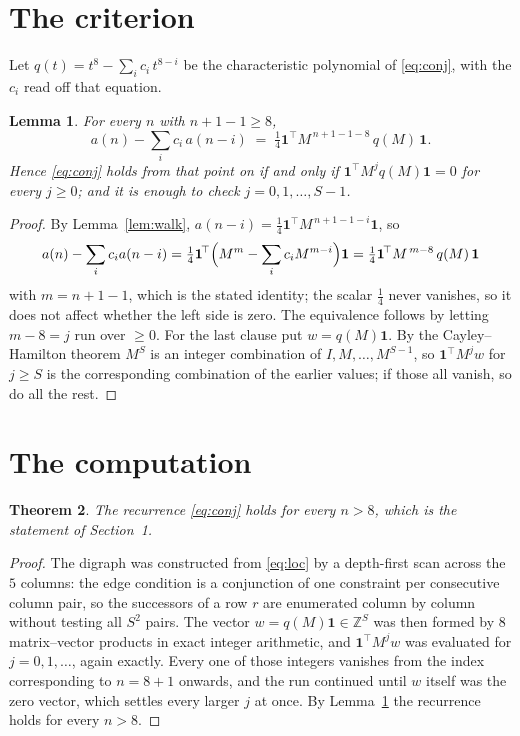 \documentclass[11pt,a4paper]{article}
\theoremstyle{plain}
\newtheorem{theorem}{Theorem}
\newtheorem{lemma}[theorem]{Lemma}
\theoremstyle{definition}
\begin{document}
\section{The criterion}

Let $q(t)=t^{8}-\sum_i c_i\,t^{8-i}$ be the characteristic polynomial of
\eqref{eq:conj}, with the $c_i$ read off that equation.

\begin{lemma}\label{lem:crit}
For every $n$ with $n+1-1\ge8$,
\[
a(n)-\sum_i c_i\,a(n-i)\;=\;\tfrac1{4}\mathbf{1}^{\!\top}M^{\,n+1-1-8}\,q(M)\,\mathbf{1} .
\]
Hence \eqref{eq:conj} holds from that point on if and only if
$\mathbf{1}^{\!\top}M^{j}q(M)\mathbf{1}=0$ for every $j\ge0$; and it is enough to check
$j=0,1,\dots,S-1$.
\end{lemma}

\begin{proof}
By Lemma~\ref{lem:walk}, $a(n-i)=\tfrac1{4}\mathbf{1}^{\!\top}M^{\,n+1-1-i}\mathbf{1}$, so
\[
a(n)-\sum_i c_i a(n-i)
=\tfrac1{4}\mathbf{1}^{\!\top}\Bigl(M^{m}-\sum_i c_i M^{m-i}\Bigr)\mathbf{1}
=\tfrac1{4}\mathbf{1}^{\!\top}M^{\,m-8}\,q(M)\,\mathbf{1}
\]
with $m=n+1-1$, which is the stated identity; the scalar $\tfrac1{4}$ never vanishes, so
it does not affect whether the left side is zero. The equivalence follows by letting
$m-8=j$ run over $\ge0$. For the last clause put $w=q(M)\mathbf{1}$. By the
Cayley--Hamilton theorem $M^{S}$ is an integer combination of $I,M,\dots,M^{S-1}$, so
$\mathbf{1}^{\!\top}M^{j}w$ for $j\ge S$ is the corresponding combination of the earlier
values; if those all vanish, so do all the rest.
\end{proof}

\section{The computation}

\begin{theorem}
The recurrence \eqref{eq:conj} holds for every $n>8$, which is the statement of
Section~1.
\end{theorem}

\begin{proof}
The digraph was constructed from \eqref{eq:loc} by a depth-first scan across the $5$
columns: the edge condition is a conjunction of one constraint per consecutive column
pair, so the successors of a row $r$ are enumerated column by column without testing all
$S^2$ pairs. The vector $w=q(M)\mathbf{1}\in\mathbb{Z}^{S}$ was then formed by $8$
matrix--vector products in exact integer arithmetic, and $\mathbf{1}^{\!\top}M^{j}w$ was
evaluated for $j=0,1,\dots$, again exactly. Every one of those integers vanishes from the
index corresponding to $n=8+1$ onwards, and the run continued until $w$ itself was the
zero vector, which settles every larger $j$ at once. By Lemma~\ref{lem:crit} the recurrence
holds for every $n>8$.
\end{proof}
\end{document}
